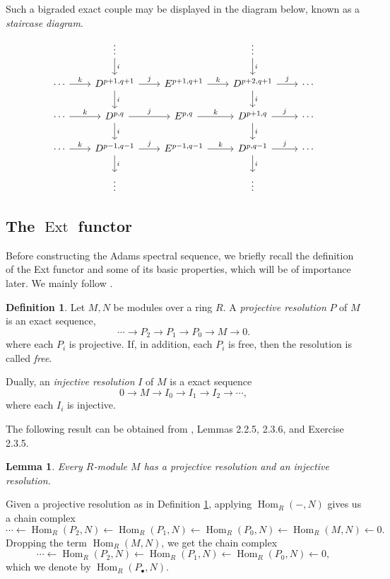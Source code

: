 \documentclass[11pt, titlepage]{article} %
\DeclareMathOperator{\Ext}{Ext}
\DeclareMathOperator{\Hom}{Hom}
\numberwithin{equation}{subsection}
\theoremstyle{plain}
\newtheorem{lemma}[theorem]{Lemma}
\theoremstyle{definition}
\newtheorem{definition}[theorem]{Definition}
\begin{document}
Such a bigraded exact couple may be displayed in the diagram below, known as a \textit{staircase diagram}.
\[\begin{tikzcd}[row sep=4ex, column sep=5ex]
   &  \vdots \arrow[d, "i"] &  & \vdots \arrow[d, "i"] & \\
 \cdots \arrow[r, "k"] & D^{p+1, q+1} \arrow[d, "i"] \arrow[r, "j"] & E^{p+1,q+1}  \arrow[r, "k"] & D^{p+2,q+1} \arrow[d, "i"] \arrow[r, "j"] & \cdots \\
 \cdots \arrow[r, "k"] & D^{p,q} \arrow[d, "i"] \arrow[r, "j"] & E^{p,q}  \arrow[r, "k"] & D^{p+1,q} \arrow[d, "i"] \arrow[r, "j"] & \cdots \\
 \cdots \arrow[r, "k"] & D^{p-1,q-1}  \arrow[d, "i"] \arrow[r, "j"] & E^{p-1,q-1}  \arrow[r, "k"] & D^{p,q-1} \arrow[d, "i"] \arrow[r, "j"] & \cdots \\
 & \vdots &  & \vdots & 
\end{tikzcd}\]
\subsection{The \(\Ext\) functor}\label{2504291247}
Before constructing the Adams spectral sequence, we briefly recall the definition of the Ext functor and some of its basic properties, which will be of importance later. We mainly follow \autocite{weibel}.

\begin{definition}\label{2504211942}
Let \(M, N\) be modules over a ring \(R\). A \textit{projective resolution} \(P\) of \(M\) is an exact sequence,
\[\cdots \to P_2 \to P_1 \to P_0 \to M \to 0.\]
where each \(P_i\) is projective. If, in addition, each \(P_i\) is free, then the resolution is called \textit{free}. 

Dually, an \textit{injective resolution} \(I\) of \(M\) is a exact sequence
\[0 \to M \to I_0 \to I_1 \to I_2 \to \cdots,\]
where each \(I_i\) is injective.
\end{definition}

The following result can be obtained from \autocite{weibel}, Lemmas 2.2.5, 2.3.6, and Exercise 2.3.5. 

\begin{lemma}
Every \(R\)-module \(M\) has a projective resolution and an injective resolution. 
\end{lemma}

Given a projective resolution as in Definition  \ref{2504211942}, applying \(\Hom_R(-, N)\) gives us a chain complex
\[\cdots \leftarrow \Hom_R(P_2, N) \leftarrow \Hom_R(P_1, N) \leftarrow \Hom_R(P_0, N) \leftarrow \Hom_R(M, N) \leftarrow 0.\]
Dropping the term \(\Hom_R(M, N)\), we get the chain complex
\[\cdots \leftarrow \Hom_R(P_2, N) \leftarrow \Hom_R(P_1, N) \leftarrow \Hom_R(P_0, N) \leftarrow 0,\]
which we denote by \(\Hom_R(P_\bullet, N)\). 
\end{document}
